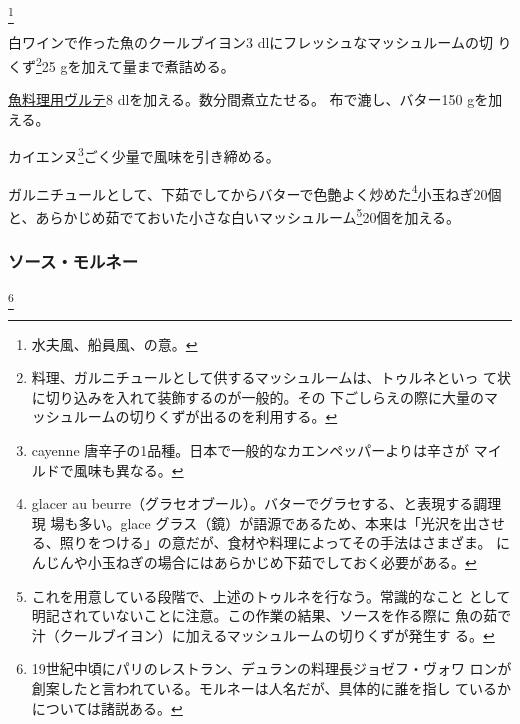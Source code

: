 \begin{recette}
\footnote{水夫風、船員風、の意。}


白ワインで作った魚のクールブイヨン3 dlにフレッシュなマッシュルームの切
りくず\footnote{料理、ガルニチュールとして供するマッシュルームは、トゥルネといっ
  て状に切り込みを入れて装飾するのが一般的。その
  下ごしらえの際に大量のマッシュルームの切りくずが出るのを利用する。}25
gを加えて\untiers{}量まで煮詰める。

\protect\hyperlink{veloute-de-poisson}{魚料理用ヴルテ}8
dlを加える。数分間煮立たせる。 布で漉し、バター150 gを加える。

カイエンヌ\footnote{cayenne
  唐辛子の1品種。日本で一般的なカエンペッパーよりは辛さが
  マイルドで風味も異なる。}ごく少量で風味を引き締める。

ガルニチュールとして、下茹でしてからバターで色艶よく炒めた\footnote{glacer
  au beurre（グラセオブール）。バターでグラセする、と表現する調理現
  場も多い。glace グラス（鏡）が語源であるため、本来は「光沢を出させ
  る、照りをつける」の意だが、食材や料理によってその手法はさまざま。
  にんじんや小玉ねぎの場合にはあらかじめ下茹でしておく必要がある。}小玉ねぎ20個
と、あらかじめ茹でておいた小さな白いマッシュルーム\footnote{これを用意している段階で、上述のトゥルネを行なう。常識的なこと
  として明記されていないことに注意。この作業の結果、ソースを作る際に
  魚の茹で汁（クールブイヨン）に加えるマッシュルームの切りくずが発生す
  る。}20個を加える。

\maeaki

\hypertarget{sauce-mornay}{%
\subsubsection{ソース・モルネー}\label{sauce-mornay}}

\footnote{19世紀中頃にパリのレストラン、デュランの料理長ジョゼフ・ヴォワ
  ロンが創案したと言われている。モルネーは人名だが、具体的に誰を指し
  ているかについては諸説ある。}



\end{recette}
